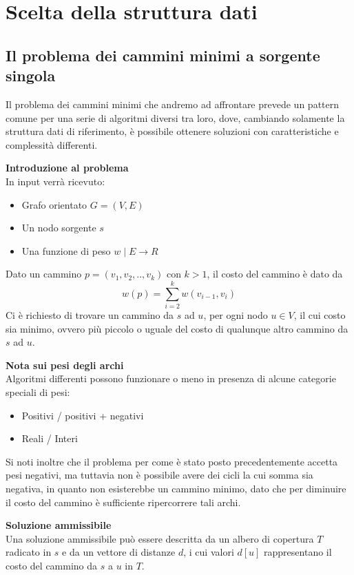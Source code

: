 \documentclass[../cheatSheetAlgoritmi.tex]{subfiles}
\begin{document}
\chapter{Scelta della struttura dati}
\section{Il problema dei cammini minimi a sorgente singola}
Il problema dei cammini minimi che andremo ad affrontare prevede un pattern comune per una serie di algoritmi diversi tra loro, dove, cambiando solamente la struttura dati di riferimento, è possibile ottenere soluzioni con caratteristiche e complessità differenti.

\bigskip
\textbf{Introduzione al problema} \\
In input verrà ricevuto: 
\begin{itemize}
	\item Grafo orientato $G = (V, E)$
	\item Un nodo sorgente $s$
	\item Una funzione di peso $w \mid E \rightarrow R$
\end{itemize} 
Dato un cammino $p = (v_1, v_2, .. , v_k)$ con $k > 1$, il costo del cammino è dato da 
\begin{equation*}
	w(p) = \sum_{i = 2}^{k} w(v_{i-1}, v_i)
\end{equation*}
Ci è richiesto di trovare un cammino da $s$ ad $u$, per ogni nodo $u \in V$, il cui costo sia minimo, ovvero più piccolo o uguale del costo di qualunque altro cammino da $s$ ad $u$.

\bigskip
\textbf{Nota sui pesi degli archi} \\
Algoritmi differenti possono funzionare o meno in presenza di alcune categorie speciali di pesi:
\begin{itemize}
\item Positivi / positivi + negativi
\item Reali / Interi
\end{itemize}
Si noti inoltre che il problema per come è stato posto precedentemente accetta pesi negativi, ma tuttavia non è possibile avere dei cicli la cui somma sia negativa, in quanto non esisterebbe un cammino minimo, dato che per diminuire il costo del cammino è sufficiente ripercorrere tali archi.

\bigskip
\textbf{Soluzione ammissibile}\\
Una soluzione ammissibile può essere descritta da un albero di copertura $T$ radicato in $s$ e da un vettore di distanze $d$, i cui valori $d[u]$ rappresentano il costo del cammino da $s$ a $u$ in $T$.
\end{document}
